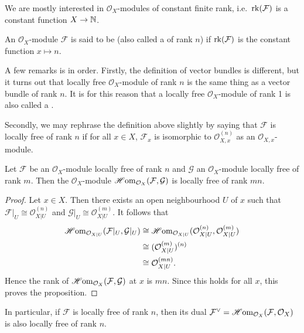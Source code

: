 We are mostly interested in $\mathcal{O}_X$-modules of constant finite rank, i.e.~$\operatorname{rk}(\mathcal{F})$ is a constant function $X \to \mathbb N$. 
\begin{definition}
	An $\mathcal{O}_X$-module $\mathcal{F}$ is said to be  (also called a  of rank $n$) if $\operatorname{rk}(\mathcal{F})$ is the constant function $x \mapsto n$. 
\end{definition}

A few remarks is in order. Firstly, the definition of vector bundles is different, but it turns out that locally free $\mathcal{O}_X$-module of rank $n$ is the same thing as a vector bundle of rank $n$. It is for this reason that a locally free $\mathcal{O}_X$-module of rank 1 is also called a .

Secondly, we may rephrase the definition above slightly by saying that $\mathcal{F}$ is locally free of rank $n$ if for all $x \in X$, $\mathcal{F}_x$ is isomorphic to $\mathcal{O}_{X, x}^{(n)}$ as an $\mathcal{O}_{X, x}$-module.

\begin{proposition}
	Let $\mathcal{F}$ be an $\mathcal{O}_X$-module locally free of rank $n$ and $\mathcal{G}$ an $\mathcal{O}_X$-module locally free of rank $m$. Then the $\mathcal{O}_X$-module $\operatorname{\mathscr{H}om}_{\mathcal{O}_X}(\mathcal{F}, \mathcal{G})$ is locally free of rank $mn$.
\end{proposition}

\begin{proof}
	Let $x \in X$. Then there exists an open neighbourhood $U$ of $x$ such that $\mathcal{F}|_{U} \cong \mathcal{O}_{X|U}^{(n)}$ and $\mathcal{G}|_{U} \cong \mathcal{O}_{X|U}^{(m)}$. It follows that
	\begin{align*}
		\operatorname{\mathscr{H}om}_{\mathcal{O}_{X|U}}(\mathcal{F}|_{U}, \mathcal{G}|_{U}) & \cong \operatorname{\mathscr{H}om}_{\mathcal{O}_{X|U}}(\mathcal{O}_{X|U}^{(n)},\mathcal{O}_{X|U}^{(m)}) \\
		& \cong (\mathcal{O}_{X|U}^{(m)})^{(n)} \\
		& \cong \mathcal{O}_{X|U}^{(mn)}.
	\end{align*}
	Hence the rank of $\operatorname{\mathscr{H}om}_{\mathcal{O}_X}(\mathcal{F}, \mathcal{G})$ at $x$ is $mn$. Since this holds for all $x$, this proves the proposition.
\end{proof}

In particular, if $\mathcal{F}$ is locally free of rank $n$, then its dual $\mathcal{F}^\vee = \operatorname{\mathscr{H}om}_{\mathcal{O}_X}(\mathcal{F}, \mathcal{O}_X)$ is also locally free of rank $n$.

